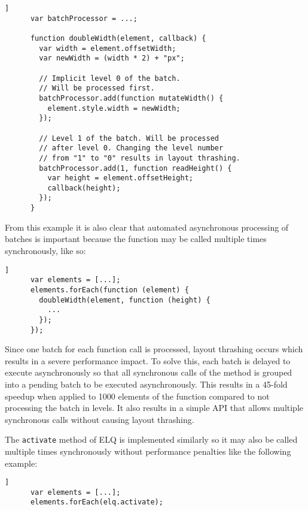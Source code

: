 \documentclass{acm_proc_article-sp}
\newcommand{\code}[1]{\texttt{#1}}
\newcommand{\elq}{ELQ}
\begin{document}
    \begin{lstlisting}[gobble=6,label={},caption={},captionpos=b]]
      var batchProcessor = ...;

      function doubleWidth(element, callback) {
        var width = element.offsetWidth;
        var newWidth = (width * 2) + "px";

        // Implicit level 0 of the batch. 
        // Will be processed first.
        batchProcessor.add(function mutateWidth() {
          element.style.width = newWidth;
        });

        // Level 1 of the batch. Will be processed 
        // after level 0. Changing the level number 
        // from "1" to "0" results in layout thrashing.
        batchProcessor.add(1, function readHeight() {
          var height = element.offsetHeight;
          callback(height);
        });
      }
    \end{lstlisting}

    From this example it is also clear that automated asynchronous processing of batches is important because the function may be called multiple times synchronously, like so:

    \begin{lstlisting}[gobble=6,label={},caption={},captionpos=b]]
      var elements = [...];
      elements.forEach(function (element) {
        doubleWidth(element, function (height) {
          ...
        });
      });
    \end{lstlisting}

    Since one batch for each function call is processed, layout thrashing occurs which results in a severe performance impact.
    To solve this, each batch is delayed to execute asynchronously so that all synchronous calls of the method is grouped into a pending batch to be executed asynchronously.
    This results in a 45-fold speedup when applied to 1000 elements of the function compared to not processing the batch in levels.
    It also results in a simple API that allows multiple synchronous calls without causing layout thrashing.

    The \code{activate} method of \elq{} is implemented similarly so it may also be called multiple times synchronously without performance penalties like the following example:

    \begin{lstlisting}[gobble=6,label={},caption={},captionpos=b]]
      var elements = [...];
      elements.forEach(elq.activate);
    \end{lstlisting}
  
\end{document}
